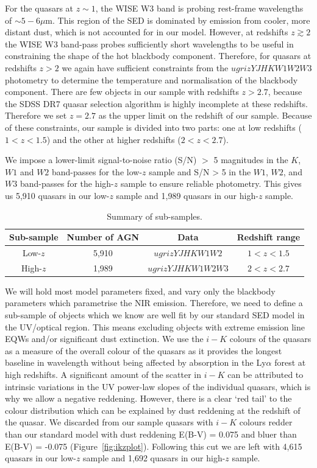 For the quasars at $z \sim 1$, the WISE W3 band is probing rest-frame wavelengths of $\sim5-6\mu$m. 
This region of the \ac{SED} is dominated by emission from cooler, more distant dust, which is not accounted for in our model.
However, at redshifts $z \gtrsim 2$ the WISE W3 band-pass probes sufficiently short wavelengths to be useful in constraining the shape of the hot blackbody component. 
Therefore, for quasars at redshifts $z > 2$ we again have sufficient constraints from the $ugrizYJHKW1W2W3$ photometry to determine the temperature and normalisation of the blackbody component. 
There are few objects in our sample with redshifts $z > 2.7$, because the SDSS DR7 quasar selection algorithm is highly incomplete at these redshifts.  
Therefore we set $z=2.7$ as the upper limit on the redshift of our sample. 
Because of these constraints, our sample is divided into two parts: one at low redshifts ($1 < z < 1.5$) and the other at higher redshifts ($2 < z < 2.7$). 

We impose a lower-limit signal-to-noise ratio (S/N) $>$ 5 magnitudes in the $K$, $W1$ and $W2$ band-passes for the low-$z$ sample and S/N > 5 in the $W1$, $W2$, and $W3$ band-passes for the high-$z$ sample to ensure reliable photometry.
This gives us 5,910 quasars in our low-$z$ sample and 1,989 quasars in our high-$z$ sample. 

\begin{table}
  \small
  \centering
  \begin{tabular}{cccc}
    \hline 
    Sub-sample & Number of \ac{AGN} & Data & Redshift range \\
    \hline 
    Low-$z$ & 5,910 & $ugrizYJHKW1W2$ & $1 < z < 1.5$ \\
    High-$z$ & 1,989 & $ugrizYJHKW1W2W3$ & $2 < z < 2.7$ \\           
    \hline
  \end{tabular}
  \caption{Summary of sub-samples.}
  \label{tab:sub-samples}
\end{table}


We will hold most model parameters fixed, and vary only the blackbody parameters which parametrise the \ac{NIR} emission. 
Therefore, we need to define a sub-sample of objects which we know are well fit by our standard \ac{SED} model in the UV/optical region. 
This means excluding objects with extreme emission line \ac{EQW}s and/or significant dust extinction.
We use the $i-K$ colours of the quasars as a measure of the overall colour of the quasars as it provides the longest baseline in wavelength without being affected by absorption in the Ly$\alpha$ forest at high redshifts. 
A significant amount of the scatter in $i-K$ can be attributed to intrinsic variations in the UV power-law slopes of the individual quasars, which is why we allow a negative reddening. 
However, there is a clear `red tail' to the colour distribution which can be explained by dust reddening at the redshift of the quasar.
We discarded from our sample quasars with $i - K$ colours redder than our standard model with dust reddening E(B-V) = 0.075 and bluer than E(B-V) = -0.075 (Figure~\ref{fig:ikzplot}). 
Following this cut we are left with 4,615 quasars in our low-$z$ sample and 1,692 quasars in our high-$z$ sample. 

